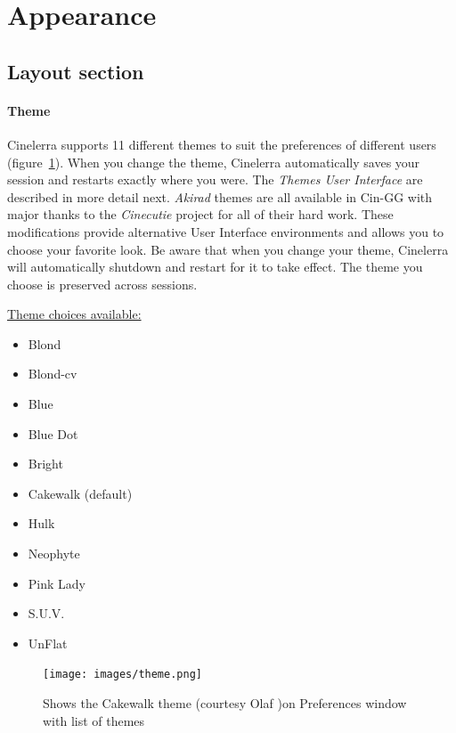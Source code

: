 \section{Appearance}%
\label{sec:appearance}

\subsection{Layout section}%
\label{sub:layout_section}

\paragraph{Theme} Cinelerra supports 11 different themes to suit the preferences of different users (figure~\ref{fig:theme}).  When you change the theme, Cinelerra automatically saves your session and restarts exactly where you were.  The \textit{Themes User Interface} are described in more detail next.  \textit{Akirad} themes are all available in Cin-GG with major thanks to the \textit{Cinecutie} project for all of their hard work. These modifications provide alternative User Interface environments and allows you to choose your favorite look.  Be aware that when you change your theme, Cinelerra will automatically shutdown and restart for it to take effect.  The theme you choose is preserved across sessions.

\underline{Theme choices available:}

\begin{itemize}[noitemsep]
    \item Blond
    \item Blond-cv
    \item Blue
    \item Blue Dot
    \item Bright
    \item Cakewalk (default)
    \item Hulk
    \item Neophyte
    \item Pink Lady
    \item S.U.V.
    \item UnFlat
\end{itemize}


\begin{figure}[htpb]
    \centering \texttt{[image: images/theme.png]}
    \caption{Shows the Cakewalk theme (courtesy Olaf )on Preferences window with list of themes}
    \label{fig:theme}
\end{figure}


